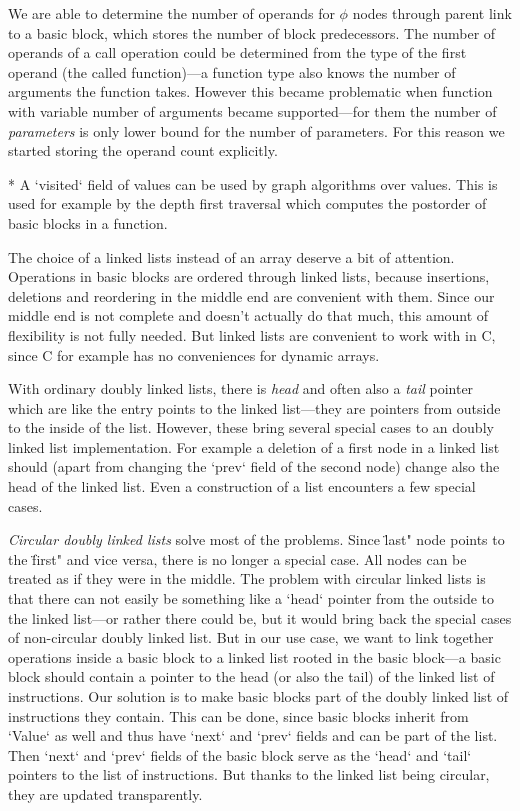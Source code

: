 We are able to determine the number of operands for $\phi$ nodes
through parent link to a basic block, which stores the number of block
predecessors. The number of operands of a call operation could be determined from the
type of the first operand (the called function)---a function type also knows the
number of arguments the function takes. However this became problematic when
function with variable number of arguments became supported---for them the
number of {\em parameters} is only lower bound for the number of parameters. For
this reason we started storing the operand count explicitly.

* A `visited` field of values can be used by graph algorithms over values. This
is used for example by the depth first traversal which computes the postorder
of basic blocks in a function.
\enditems

The choice of a linked lists instead of an array deserve a bit of attention.
Operations in basic blocks are ordered through linked lists, because insertions,
deletions and reordering in the middle end are convenient with them. Since our
middle end is not complete and doesn't actually do that much, this amount of
flexibility is not fully needed. But linked lists are convenient to work with in C,
since C for example has no conveniences for dynamic arrays.

With ordinary doubly linked lists, there is {\em head} and often also a {\em
tail} pointer which are like the entry points to the linked list---they are
pointers from outside to the inside of the list. However, these bring several special
cases to an doubly linked list implementation. For example a deletion of a first
node in a linked list should (apart from changing the `prev` field of the second
node) change also the head of the linked list. Even a construction of a list
encounters a few special cases.

{\em Circular doubly linked lists} solve most of the problems. Since \"last"
node points to the \"first" and vice versa, there is no longer a special case. All
nodes can be treated as if they were in the middle. The problem with circular
linked lists is that there can not easily be something like a `head` pointer
from the outside to the linked list---or rather there could be, but it would
bring back the special cases of non-circular doubly linked list. But in our use
case, we want to link together operations inside a basic block to a linked list
rooted in the basic block---a basic block should contain a pointer to the head (or
also the tail) of the linked list of instructions. Our solution is to make basic
blocks part of the doubly linked list of instructions they contain. This can be
done, since basic blocks inherit from `Value` as well and thus have `next` and
`prev` fields and can be part of the list. Then `next` and
`prev` fields of the basic block serve as the `head` and `tail` pointers to the list of
instructions. But thanks to the linked list being circular, they are updated
transparently.

